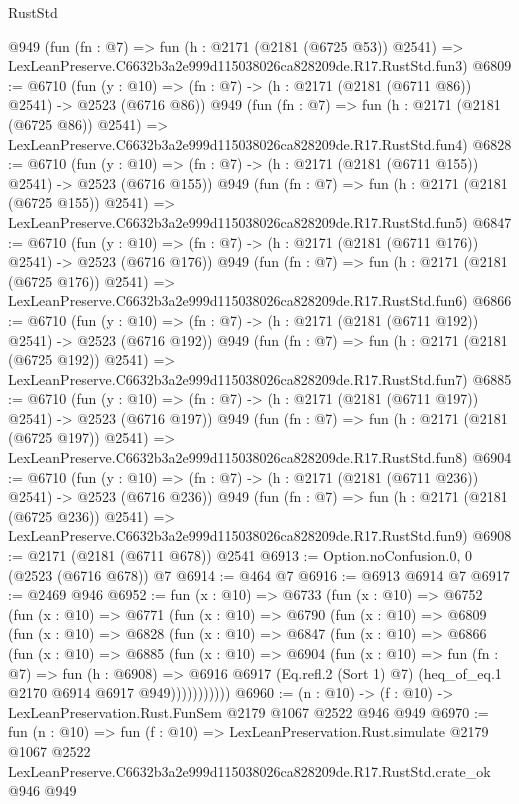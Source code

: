\begin{lexlean}{RustStd}
\begin{coremodule}
    @949
    (fun (fn : @7) =>
    fun (h : @2171 (@2181 (@6725 @53)) @2541) =>
    LexLeanPreserve.C6632b3a2e999d115038026ca828209de.R17.RustStd.fun3)
@6809 := @6710
    (fun (y : @10) => (fn : @7) -> (h : @2171 (@2181 (@6711 @86)) @2541) -> @2523 (@6716 @86))
    @949
    (fun (fn : @7) =>
    fun (h : @2171 (@2181 (@6725 @86)) @2541) =>
    LexLeanPreserve.C6632b3a2e999d115038026ca828209de.R17.RustStd.fun4)
@6828 := @6710
    (fun (y : @10) => (fn : @7) -> (h : @2171 (@2181 (@6711 @155)) @2541) -> @2523 (@6716 @155))
    @949
    (fun (fn : @7) =>
    fun (h : @2171 (@2181 (@6725 @155)) @2541) =>
    LexLeanPreserve.C6632b3a2e999d115038026ca828209de.R17.RustStd.fun5)
@6847 := @6710
    (fun (y : @10) => (fn : @7) -> (h : @2171 (@2181 (@6711 @176)) @2541) -> @2523 (@6716 @176))
    @949
    (fun (fn : @7) =>
    fun (h : @2171 (@2181 (@6725 @176)) @2541) =>
    LexLeanPreserve.C6632b3a2e999d115038026ca828209de.R17.RustStd.fun6)
@6866 := @6710
    (fun (y : @10) => (fn : @7) -> (h : @2171 (@2181 (@6711 @192)) @2541) -> @2523 (@6716 @192))
    @949
    (fun (fn : @7) =>
    fun (h : @2171 (@2181 (@6725 @192)) @2541) =>
    LexLeanPreserve.C6632b3a2e999d115038026ca828209de.R17.RustStd.fun7)
@6885 := @6710
    (fun (y : @10) => (fn : @7) -> (h : @2171 (@2181 (@6711 @197)) @2541) -> @2523 (@6716 @197))
    @949
    (fun (fn : @7) =>
    fun (h : @2171 (@2181 (@6725 @197)) @2541) =>
    LexLeanPreserve.C6632b3a2e999d115038026ca828209de.R17.RustStd.fun8)
@6904 := @6710
    (fun (y : @10) => (fn : @7) -> (h : @2171 (@2181 (@6711 @236)) @2541) -> @2523 (@6716 @236))
    @949
    (fun (fn : @7) =>
    fun (h : @2171 (@2181 (@6725 @236)) @2541) =>
    LexLeanPreserve.C6632b3a2e999d115038026ca828209de.R17.RustStd.fun9)
@6908 := @2171 (@2181 (@6711 @678)) @2541
@6913 := Option.noConfusion.{0, 0} (@2523 (@6716 @678)) @7
@6914 := @464 @7
@6916 := @6913 @6914 @7
@6917 := @2469 @946
@6952 := fun (x : @10) =>
  @6733
    (fun (x : @10) =>
    @6752
      (fun (x : @10) =>
      @6771
        (fun (x : @10) =>
        @6790
          (fun (x : @10) =>
          @6809
            (fun (x : @10) =>
            @6828
              (fun (x : @10) =>
              @6847
                (fun (x : @10) =>
                @6866
                  (fun (x : @10) =>
                  @6885
                    (fun (x : @10) =>
                    @6904
                      (fun (x : @10) =>
                      fun (fn : @7) =>
                      fun (h : @6908) =>
                      @6916
                        @6917
                        (Eq.refl.{2} (Sort 1) @7)
                        (heq_of_eq.{1} @2170 @6914 @6917 @949)))))))))))
@6960 := (n : @10) -> (f : @10) -> LexLeanPreservation.Rust.FunSem @2179 @1067 @2522 @946 @949
@6970 := fun (n : @10) =>
  fun (f : @10) =>
  LexLeanPreservation.Rust.simulate
    @2179
    @1067
    @2522
    LexLeanPreserve.C6632b3a2e999d115038026ca828209de.R17.RustStd.crate_ok
    @946
    @949
\end{coremodule}
\end{lexlean}
